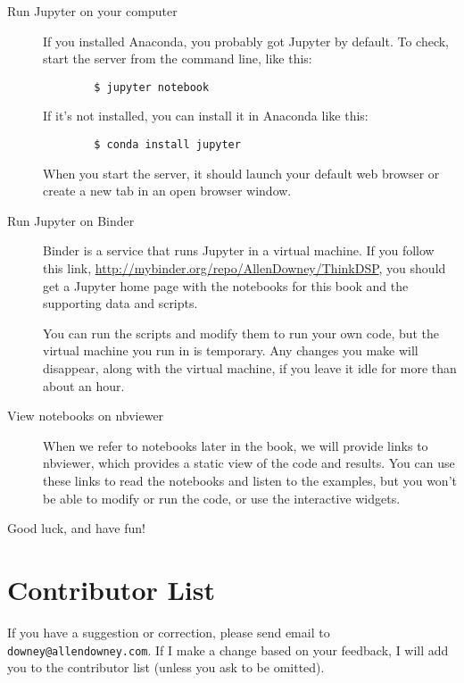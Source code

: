 \begin{description}
	
	\item[Run Jupyter on your computer]
	
	If you installed Anaconda, you
	probably got Jupyter by default.  To check, start the server from
	the command line, like this:
	
	\begin{verbatim}
		$ jupyter notebook
	\end{verbatim}
	
	If it's not installed, you can install it in Anaconda like this:
	
	\begin{verbatim}
		$ conda install jupyter
	\end{verbatim}
	
	When you start the server, it should launch your default web browser
	or create a new tab in an open browser window.
	
	\item[Run Jupyter on Binder]
	
	Binder is a service that runs Jupyter in a virtual machine.  If you
	follow this link, \url{http://mybinder.org/repo/AllenDowney/ThinkDSP},
	you should get a Jupyter home page with the notebooks for this book
	and the supporting data and scripts.
	
	You can run the scripts and modify them to run your own code, but the
	virtual machine you run in is temporary.  Any changes you make will
	disappear, along with the virtual machine, if you leave it idle for
	more than about an hour.
	
	\item[View notebooks on nbviewer]
	
	When we refer to notebooks later in the book, we will provide links to
	nbviewer, which provides a static view of the code and results.  You
	can use these links to read the notebooks and listen to the examples,
	but you won't be able to modify or run the code, or use the
	interactive widgets.
	
\end{description}

Good luck, and have fun!



\section*{Contributor List}

If you have a suggestion or correction, please send email to
{\tt downey@allendowney.com}.  If I make a change based on your
feedback, I will add you to the contributor list
(unless you ask to be omitted).

